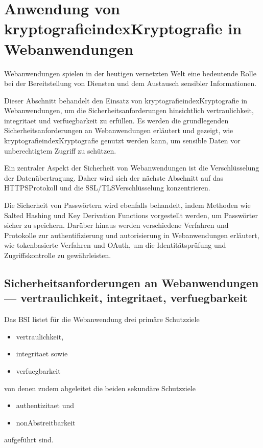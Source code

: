 \newpage
\section[Anwendung von Kryptografie in Webanwendungen]{Anwendung von \gls{kryptografie}index{Kryptografie} in Webanwendungen}\label{sec:anwendung_von_kryptografie_in_webanwendungen}
Webanwendungen spielen in der heutigen vernetzten Welt eine bedeutende Rolle bei der Bereitstellung von Diensten und dem Austausch sensibler Informationen.

Dieser Abschnitt behandelt den Einsatz von \Gls{kryptografie}index{Kryptografie} in Webanwendungen, um die Sicherheitsanforderungen hinsichtlich \gls{vertraulichkeit}, \gls{integritaet} und \gls{verfuegbarkeit} zu erfüllen.
Es werden die grundlegenden Sicherheitsanforderungen an Webanwendungen erläutert und gezeigt, wie \Gls{kryptografie}index{Kryptografie} genutzt werden kann, um sensible Daten vor unberechtigtem Zugriff zu schützen.

Ein zentraler Aspekt der Sicherheit von Webanwendungen ist die Verschlüsselung der Datenübertragung.
Daher wird sich der nächste Abschnitt auf das \ac{HTTPS}\nonbreakdash Protokoll und die \ac{SSL}/\ac{TLS}\nonbreakdash Verschlüsselung konzentrieren.

Die Sicherheit von Passwörtern wird ebenfalls behandelt, indem Methoden wie Salted Hashing und Key Derivation Functions vorgestellt werden, um Passwörter sicher zu speichern.
Darüber hinaus werden verschiedene Verfahren und Protokolle zur \gls{authentifizierung} und \gls{autorisierung} in Webanwendungen erläutert, wie \zb tokenbasierte Verfahren und OAuth, um die Identitätsprüfung und Zugriffskontrolle zu gewährleisten.

\subsection[Sicherheitsanforderungen an Webanwendungen]{Sicherheitsanforderungen an Webanwendungen — \gls{vertraulichkeit}, \gls{integritaet}, \gls{verfuegbarkeit}}\label{subsec:sicherheitsanforderungen-an-webanwendungen}

Das \ac{BSI} listet für die Webanwendung drei primäre Schutzziele
\begin{samepage}
    \begin{itemize}
        \item \gls{vertraulichkeit},
        \item \gls{integritaet} sowie
        \item \gls{verfuegbarkeit}
    \end{itemize}
\end{samepage}
von denen zudem abgeleitet \ua die beiden sekundäre Schutzziele
\begin{samepage}
    \begin{itemize}
        \item \gls{authentizitaet} und
        \item \gls{nonAbstreitbarkeit}
    \end{itemize}
\end{samepage}
aufgeführt sind\autocite[\pagef~8]{bsi-leitfaden-2022}.

